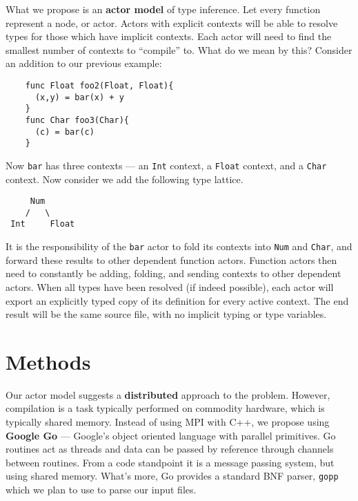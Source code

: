 \documentclass{article}[9pt]
\newenvironment{Figure}
  {\par\medskip\noindent\minipage{\linewidth}}
  {\endminipage\par\medskip}
\begin{document}
\begin{multicols}{2}
What we propose is an \textbf{actor model} of type inference. Let every
function represent a node, or actor. Actors with explicit contexts
will be able to resolve types for those which have implicit
contexts. Each actor will need to find the smallest number of contexts
to ``compile'' to. What do we mean by this? Consider an addition to our
previous example:
\begin{Figure}
  \begin{lstlisting}
    func Float foo2(Float, Float){
      (x,y) = bar(x) + y
    }
    func Char foo3(Char){
      (c) = bar(c)
    }
  \end{lstlisting}
\end{Figure}
\noindent Now \texttt{bar} has three contexts --- an \texttt{Int} context, a \texttt{Float} context, and a
\texttt{Char} context. Now consider we add the following type lattice.
\begin{Figure}
  \begin{center}
\begin{BVerbatim}
     Num
    /   \
 Int     Float
\end{BVerbatim}
\end{center}
\end{Figure}

It is the responsibility of the \texttt{bar} actor to fold its contexts into
\texttt{Num} and \texttt{Char}, and forward these results to other dependent function
actors. Function actors then need to constantly be adding, folding,
and sending contexts to other dependent actors.
When all types have been resolved (if indeed possible), each actor
will export an explicitly typed copy of its definition for every
active context. The end result will be the same source file, with no
implicit typing or type variables.

\section*{Methods}
Our actor model suggests a \textbf{distributed} approach to the
problem. However, compilation is a task typically performed on
commodity hardware, which is typically shared memory. Instead of using
MPI with C++, we propose using \textbf{Google Go} --- Google's object oriented
language with parallel primitives. Go routines act as threads and data
can be passed by reference through channels between routines. From a
code standpoint it is a message passing system, but using shared
memory. What's more, Go provides a standard BNF parser, \texttt{gopp}
which we plan to use to parse our input files.


\end{multicols}
\end{document}
